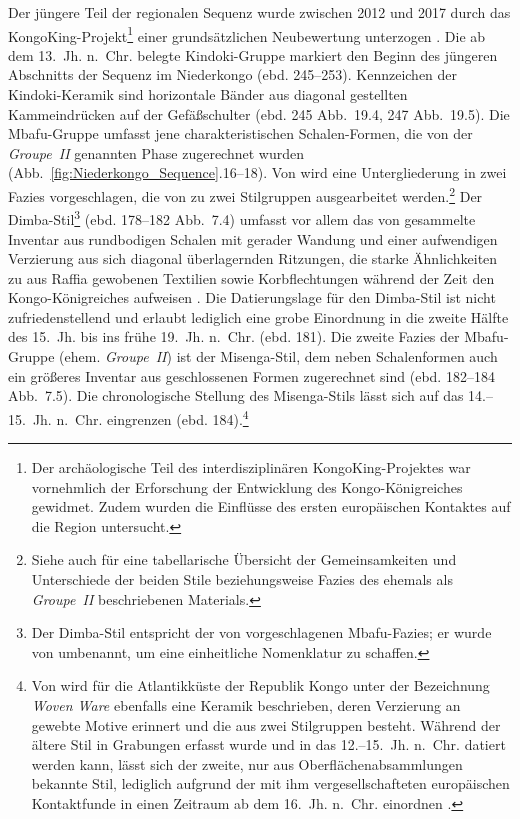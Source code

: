 Der jüngere Teil der regionalen Sequenz wurde zwischen 2012 und 2017 durch das KongoKing-Projekt\footnote{Der archäologische Teil des interdisziplinären KongoKing-Projektes war vornehmlich der Erforschung der Entwicklung des Kongo-Königreiches gewidmet. Zudem wurden die Einflüsse des ersten europäischen Kontaktes auf die Region untersucht.\label{ftn:KongoKingProj}} einer grundsätzlichen Neubewertung unterzogen \parencites[443 Abb.~31.1]{Clist.2018b}{Clist.2018c}. Die ab dem 13.~Jh. n.~Chr. belegte Kindoki-Gruppe markiert den Beginn des jüngeren Abschnitts der Sequenz im Niederkongo (ebd. 245--253). Kennzeichen der Kindoki-Keramik sind horizontale Bänder aus diagonal gestellten Kammeindrücken auf der Gefäßschulter (ebd. 245 Abb.~19.4, 247 Abb.~19.5). Die Mbafu-Gruppe umfasst jene charakteristischen Schalen-Formen, die von \textcites{Mortelmans.1962}{Mortelmans.1962b} der \textit{Groupe~II} genannten Phase zugerechnet wurden (Abb.~\ref{fig:Niederkongo_Sequence}.16--18). Von \textcite[193\,f.]{Clist.2012a} wird eine Untergliederung in zwei Fazies vorgeschlagen, die von \textcite{Cranshof.2018} zu zwei Stilgruppen ausgearbeitet werden.\footnote{Siehe auch \textcite[249 Tab.~19.1]{Clist.2018c} für eine tabellarische Übersicht der Gemeinsamkeiten und Unterschiede der beiden Stile beziehungsweise Fazies des ehemals als \textit{Groupe~II} beschriebenen Materials.} Der Dimba-Stil\footnote{Der Dimba-Stil entspricht der von \textcite[193\,f.]{Clist.2012a} vorgeschlagenen Mbafu-Fazies; er wurde von \textcite{Cranshof.2018} umbenannt, um eine einheitliche Nomenklatur zu schaffen.} (ebd. 178--182 Abb.~7.4) umfasst vor allem das von \textcites{Mortelmans.1962}{Mortelmans.1962b} gesammelte Inventar aus rundbodigen Schalen mit gerader Wandung und einer aufwendigen Verzierung aus sich diagonal überlagernden Ritzungen, die starke Ähnlichkeiten zu aus Raffia gewobenen Textilien sowie Korbflechtungen während der Zeit den Kongo-Königreiches aufweisen \parencite[170--176]{Cranshof.2018}. Die Datierungslage für den Dimba-Stil ist nicht zufriedenstellend und erlaubt lediglich eine grobe Einordnung in die zweite Hälfte des 15.~Jh. bis ins frühe 19.~Jh. n.~Chr. (ebd. 181). Die zweite Fazies der Mbafu-Gruppe (ehem. \textit{Groupe~II}) ist der Misenga-Stil, dem neben Schalenformen auch ein größeres Inventar aus geschlossenen Formen zugerechnet sind (ebd. 182--184 Abb.~7.5). Die chronologische Stellung des Misenga-Stils lässt sich auf das 14.--15.~Jh. n.~Chr. eingrenzen (ebd. 184).\footnote{Von \textcite{Denbow.2014} wird für die Atlantikküste der Republik Kongo unter der Bezeichnung \textit{Woven Ware} ebenfalls eine Keramik beschrieben, deren Verzierung an gewebte Motive erinnert und die aus zwei Stilgruppen besteht. Während der ältere Stil in Grabungen erfasst wurde und in das 12.--15.~Jh. n.~Chr. datiert werden kann, lässt sich der zweite, nur aus Oberflächenabsammlungen bekannte Stil, lediglich aufgrund der mit ihm vergesellschafteten europäischen Kontaktfunde in einen Zeitraum ab dem 16.~Jh. n.~Chr. einordnen \parencite[ebd. 69\,f., 136;][188\,f.]{Cranshof.2018}.}

